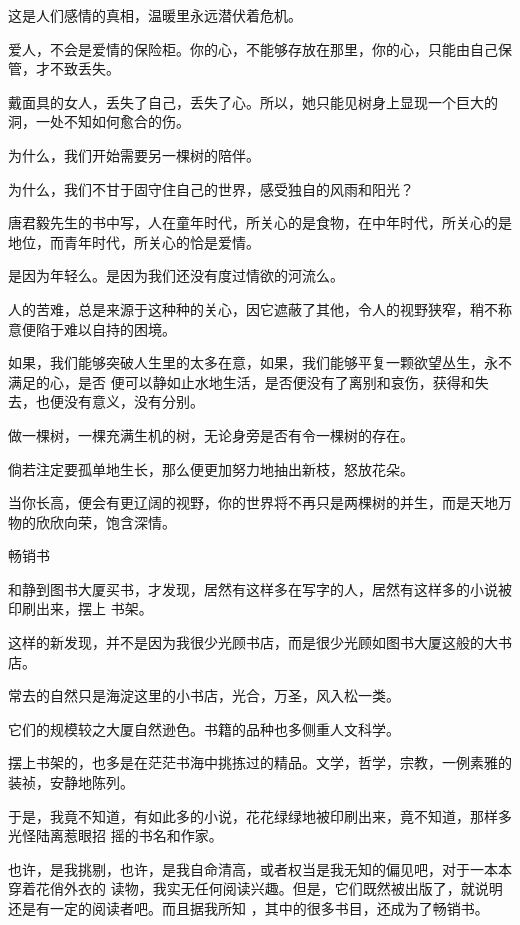 \documentclass[12pt,a4paper]{article}
\newcommand{\subpart}[1]{
	\begingroup \par
	\vspace{1ex} \centering #1
	\par \endgroup \nopagebreak[4]
}
\begin{document}
		这是人们感情的真相，温暖里永远潜伏着危机。\par
		爱人，不会是爱情的保险柜。你的心，不能够存放在那里，你的心，只能由自己保管，才不致丢失。\par
		戴面具的女人，丢失了自己，丢失了心。所以，她只能见树身上显现一个巨大的洞，一处不知如何愈合的伤。

		为什么，我们开始需要另一棵树的陪伴。\par
		为什么，我们不甘于固守住自己的世界，感受独自的风雨和阳光？\par
		唐君毅先生的书中写，人在童年时代，所关心的是食物，在中年时代，所关心的是地位，而青年时代，所关心的恰是爱情。\par
		是因为年轻么。是因为我们还没有度过情欲的河流么。\par
		人的苦难，总是来源于这种种的关心，因它遮蔽了其他，令人的视野狭窄，稍不称意便陷于难以自持的困境。

		如果，我们能够突破人生里的太多在意，如果，我们能够平复一颗欲望丛生，永不满足的心，是否
	便可以静如止水地生活，是否便没有了离别和哀伤，获得和失去，也便没有意义，没有分别。

		做一棵树，一棵充满生机的树，无论身旁是否有令一棵树的存在。\par
		倘若注定要孤单地生长，那么便更加努力地抽出新枝，怒放花朵。\par
		当你长高，便会有更辽阔的视野，你的世界将不再只是两棵树的并生，而是天地万物的欣欣向荣，饱含深情。

	\endwriting



		\subpart{畅销书}

		和静到图书大厦买书，才发现，居然有这样多在写字的人，居然有这样多的小说被印刷出来，摆上
	书架。\par
		这样的新发现，并不是因为我很少光顾书店，而是很少光顾如图书大厦这般的大书店。

		常去的自然只是海淀这里的小书店，光合，万圣，风入松一类。\par
		它们的规模较之大厦自然逊色。书籍的品种也多侧重人文科学。\par
		摆上书架的，也多是在茫茫书海中挑拣过的精品。文学，哲学，宗教，一例素雅的装祯，安静地陈列。

		于是，我竟不知道，有如此多的小说，花花绿绿地被印刷出来，竟不知道，那样多光怪陆离惹眼招
	摇的书名和作家。

		也许，是我挑剔，也许，是我自命清高，或者权当是我无知的偏见吧，对于一本本穿着花俏外衣的
	读物，我实无任何阅读兴趣。但是，它们既然被出版了，就说明还是有一定的阅读者吧。而且据我所知
	，其中的很多书目，还成为了畅销书。
\end{document}
